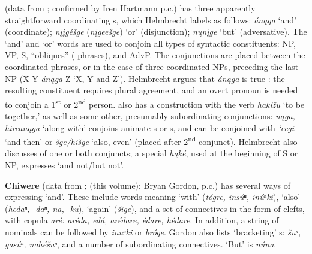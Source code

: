 \documentclass[output=paper]{LSP/langsci}
\begin{document}
\textbf{} (data from \citealt{Helmbrecht2004}; confirmed by Iren Hartmann p.c.) has three apparently straightforward coordinating s, which Helmbrecht labels as follows: \textit{án\k{a}ga} `and' (coordinate); \textit{n\k{i}\k{i}gé\v{s}ge} (\textit{n\k{i}gee\v{s}ge}) `or' (disjunction); \textit{n\k{u}n\k{i}ge} `but' (adversative). The `and' and `or' words are used to conjoin all types of syntactic constituents: NP, VP, S, ``obliques'' ( phrases), and AdvP. The conjunctions are placed between the coordinated phrases, or in the case of three coordinated NPs, preceding the last NP (X Y \textit{án\k{a}ga} Z `X, Y and Z'). Helmbrecht argues that \textit{án\k{a}ga}  is true : the resulting constituent requires plural agreement, and an overt pronoun is needed to conjoin a 1\textsuperscript{st} or 2\textsuperscript{nd} person.  also has a  construction with the verb \textit{haki\v{z}u} `to be together,' as well as some other, presumably subordinating conjunctions: \textit{n\k{a}ga, hirean\k{a}ga} `along with' conjoins animate s or s, and  can be conjoined with \textit{`eegi} `and then' or \textit{\v{s}ge/hi\v{s}ge} `also, even' (placed after 2\textsuperscript{nd} conjunct). Helmbrecht also discusses  of one or both conjuncts; a special  \textit{h\k{a}ké}, used at the beginning of S or NP, expresses `and not/but not'.

\textbf{Chiwere} (data from \citealt{Goodtracks1992}; \citealt{Greer2016} (this volume); Bry\-an Gordon, p.c.) has several ways of expressing `and'. These include words meaning `with' (\textit{tógre, insúⁿ, inúⁿki}), `also' (\textit{hedaⁿ, -daⁿ, na, -ku}), `again' (\textit{\v{s}ige}), and a set of  connectives in the form of clefts, with copula \textit{aré: aréda, edá, arédare, édare, hédare}. In addition, a string of nominals can be followed by \textit{inuⁿki} or \textit{bróge}. Gordon also lists `bracketing' s: \textit{\v{s}uⁿ, gasúⁿ, nahé\v{s}uⁿ}, and a number of subordinating connectives. `But' is \textit{núna}.

\subsection{}
 
\end{document}
